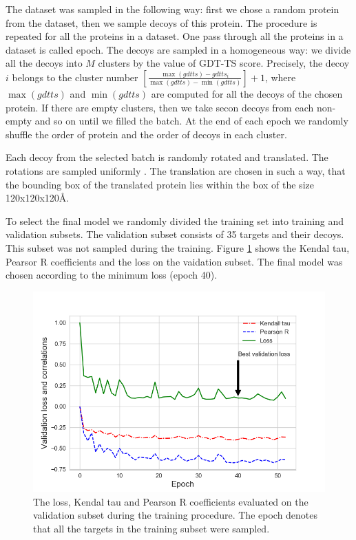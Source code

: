 \documentclass[letter,10pt]{article}
\begin{document}
The dataset was sampled in the following way: first we chose a random protein from the dataset, then we sample decoys of this protein. 
The procedure is repeated for all the 
proteins in a dataset. One pass through all the proteins in a dataset is called epoch. 
The decoys are sampled in a homogeneous way: we divide all the decoys into $M$ clusters by the value of GDT-TS score. 
Precisely, the decoy $i$ belongs to the cluster  
number $ \left[ \frac{\max(gdtts) - gdtts_i}{\max(gdtts) - \min(gdtts)} \right] + 1$, where $\max(gdtts)$ and $\min(gdtts)$ 
are computed for all the decoys of 
the chosen protein. If there are empty clusters, then we take secon decoys from each non-empty and so on until we filled the batch. 
At the end of each epoch we randomly
shuffle the order of protein and the order of decoys in each cluster. 

Each decoy from the selected batch is randomly rotated and translated. The rotations are sampled uniformly \cite{}. The translation are chosen
in such a way, that the bounding box of the translated protein lies within the box of the size 120x120x120\AA. 

To select the final model we randomly divided the training set into training and validation subsets. The validation subset consists of 
35 targets and their decoys. This subset was not sampled during the training. 
Figure \ref{Fig:TrainingLoss} shows the Kendal tau, Pearsor R coefficients and the loss on the vaidation subset. 
The final model was chosen according to the minimum loss (epoch 40).
\begin{figure}[H]
    \centering
    \includegraphics[width=\linewidth]{Fig/kendall_validation.png}
    \caption{The loss, Kendal tau and Pearson R coefficients evaluated on the validation subset during the training procedure. The epoch 
    denotes that all the targets in the training subset were sampled.}
    \label{Fig:TrainingLoss}
\end{figure}
\end{document}
